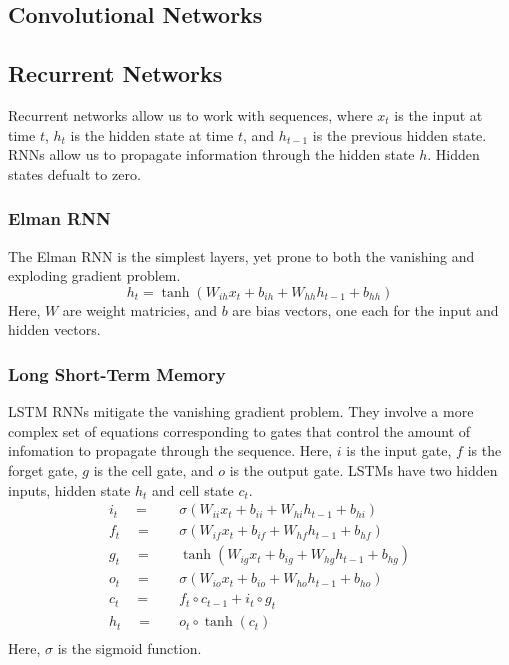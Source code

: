 \documentclass[twoside,twocolumn]{article}
\begin{document}
\subsection{Convolutional Networks}
\subsection{Recurrent Networks}
Recurrent networks allow us to work with sequences, where $x_t$ is the input
at time $t$, $h_t$ is the hidden state at time $t$, and $h_{t-1}$ is the
previous hidden state. RNNs allow us to propagate information through the
hidden state $h$. Hidden states defualt to zero.
\subsubsection{Elman RNN}
The Elman RNN is the simplest layers, yet prone to both the vanishing and
exploding gradient problem.
\begin{equation}
  h_t = \tanh \left( W_{ih} x_t + b_{ih} + W_{hh} h_{t-1} + b_{hh} \right)
\end{equation}
Here, $W$ are weight matricies, and $b$ are bias vectors, one each for the
input and hidden vectors.
\subsubsection{Long Short-Term Memory}
LSTM RNNs mitigate the vanishing gradient problem. They involve a more complex
set of equations corresponding to gates that control the amount of infomation
to propagate through the sequence. Here, $i$ is the input gate, $f$ is the
forget gate, $g$ is the cell gate, and $o$ is the output gate. LSTMs have
two hidden inputs, hidden state $h_t$ and cell state $c_t$.
\begin{equation}
  \begin{split}
    i_t \quad =& \quad \sigma \left( W_{ii} x_t + b_{ii} + W_{hi} h_{t-1} + b_{hi} \right) \\
    f_t \quad =& \quad \sigma \left( W_{if} x_t + b_{if} + W_{hf} h_{t-1} + b_{hf} \right) \\
    g_t \quad =& \quad \tanh \left( W_{ig} x_t + b_{ig} + W_{hg} h_{t-1} + b_{hg} \right) \\
    o_t \quad =& \quad \sigma \left( W_{io} x_t + b_{io} + W_{ho} h_{t-1} + b_{ho} \right) \\
    c_t \quad =& \quad f_t \circ c_{t-1} + i_t \circ g_t \\
    h_t \quad =& \quad o_t \circ \tanh \left( c_t \right) \\
  \end{split}
\end{equation}
Here, $\sigma$ is the sigmoid function.
\end{document}
